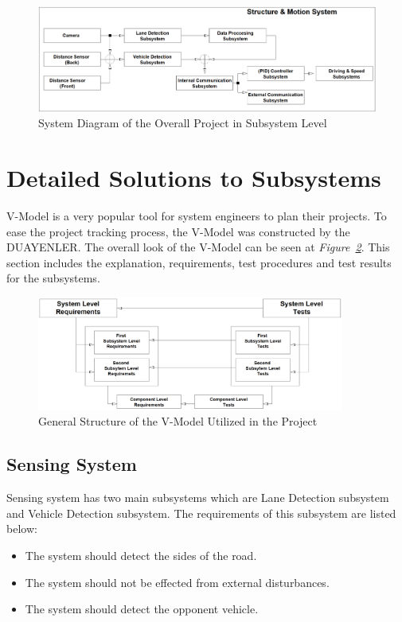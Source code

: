 \documentclass[a4paper,12pt]{article}
\begin{document}
	\begin{figure}[H]
		\center
		\setlength{\unitlength}{\textwidth} 
		\includegraphics[width=1.0\textwidth]{system-diagram/system-diagram-3}
		\caption{\label{fig:system-diagram}System Diagram of the Overall Project in Subsystem Level}
	\end{figure}
	
	
	
	
	\section{Detailed Solutions to Subsystems}
	
	V-Model is a very popular tool for system engineers to plan their projects. To ease the project tracking process, the V-Model was constructed by the DUAYENLER. The overall look of the V-Model can be seen at \textit{Figure~\ref{fig:vmodel}}. This section includes the explanation, requirements, test procedures and test results for the subsystems.
		
	\begin{figure}[H]
		\center
		\setlength{\unitlength}{\textwidth} 
		\includegraphics[width=0.9\textwidth]{v-models/V-model}
		\caption{\label{fig:vmodel}General Structure of the V-Model Utilized in the Project}
	\end{figure}
	
	\subsection{Sensing System}
	
	Sensing system has two main subsystems which are Lane Detection subsystem and Vehicle Detection subsystem. The requirements of this subsystem are listed below:
	\begin{itemize}
		\item The system should detect the sides of the road.
		\item The system should not be effected from external disturbances.
		\item The system should detect the opponent vehicle.
	\end{itemize}
	
\end{document}
